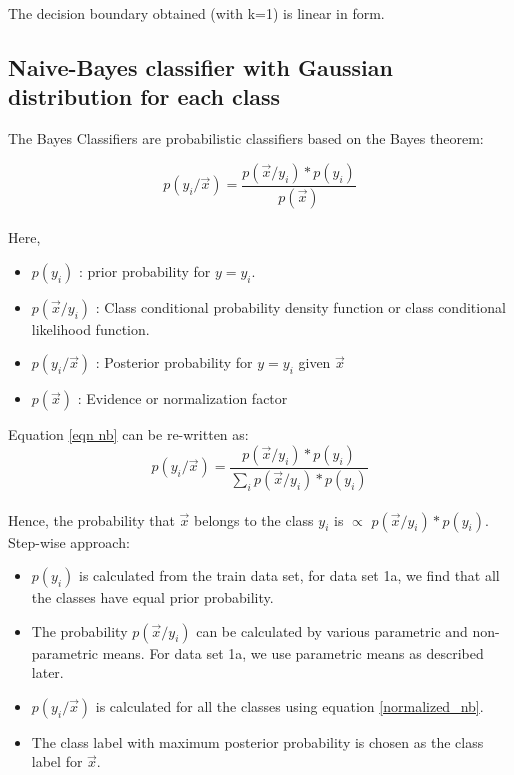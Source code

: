\documentclass[11pt,a4paper]{article}
\newcommand{\spa}{\vspace{1.25em}}
\newcommand{\noi}{\noindent}
\begin{document}
The decision boundary obtained (with k=1) is linear in form. 


\subsection{Naive-Bayes classifier with Gaussian distribution for each class}
The Bayes Classifiers are probabilistic classifiers based on the Bayes theorem:

\begin{equation}
\label{eqn nb}
    p(y_{i}/\vec{x})=\frac{p(\vec{x}/y_{i})*p(y_{i})}{p(\vec{x})}
\end{equation}\\

\noi
Here,
\begin{itemize}
    \itemsep0em
    \item $p(y_{i})$ : prior probability for $y=y_{i}$.
    \item $p(\vec{x}/y_{i})$ : Class conditional probability density function or class conditional likelihood function.
    \item $p(y_{i}/\vec{x})$ : Posterior probability for $y=y_{i}$ given $\vec{x}$
    \item $p(\vec{x})$ : Evidence or normalization factor
\end{itemize}

\spa
\noi
Equation \ref{eqn nb} can be re-written as:
\begin{equation} \label{normalized_nb}
    p(y_{i}/\vec{x})=\frac{p(\vec{x}/y_{i})*p(y_{i})}{\sum_{i}p(\vec{x}/y_{i})*p(y_{i})}
\end{equation}\\

\noi
Hence, the probability that $\vec{x}$ belongs to the class $y_{i}$ is $\propto$ $p(\vec{x}/y_{i})*p(y_{i})$.\\

\noi
Step-wise approach:
\begin{itemize}
    \itemsep0em
    \item $p(y_{i})$ is calculated from the train data set, for data set 1a, we find that all the classes have equal prior probability.
    \item The probability $p(\vec{x}/y_{i})$ can be calculated by various parametric and non-parametric means. For data set 1a, we use parametric means as described later.
    \item $p(y_{i}/\vec{x})$ is calculated for all the classes using equation \ref{normalized_nb}.
    \item The class label with maximum posterior probability is chosen as the class label for $\vec{x}$.
\end{itemize}
\end{document}
